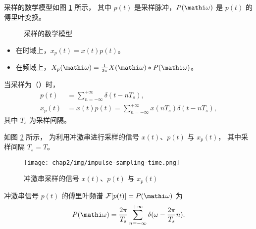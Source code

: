 \begin{definition}
    采样的数学模型如图 \ref{fig:sampling-math-model} 所示，
    其中 $p(t)$ 是采样脉冲，$P(\mathi \omega)$ 是 $p(t)$ 的傅里叶变换。
    \begin{figure}[H]
        \centering
        \caption{采样的数学模型}
        \label{fig:sampling-math-model}
    \end{figure}

    \begin{itemize}
        \item 在时域上，$x_p(t) = x(t)p(t)$。
        \item 在频域上，$X_p(\mathi \omega) = \frac{1}{2\pi}X(\mathi \omega) * P(\mathi \omega)$。
    \end{itemize}
    当采样为（）时，
    \begin{align*}
        p(t) & = \sum_{n = -\infty}^{+\infty}\delta(t - nT_s), \\
        x_p(t) & = x(t)p(t) = \sum_{n = -\infty}^{+\infty}x(nT_s)\delta(t - nT_s),
    \end{align*}
    其中 $T_s$ 为采样间隔。
\end{definition}

\begin{example}
    如图 \ref{fig:impulse-sampling-time} 所示，
    为利用冲激串进行采样的信号 $x(t)$、$p(t)$ 与 $x_p(t)$，
    其中采样间隔 $T_s = T$。
    \begin{figure}[H]
        \centering
        \texttt{[image: chap2/img/impulse-sampling-time.png]}
        \caption{冲激串采样的信号 $x(t)$、$p(t)$ 与 $x_p(t)$}
        \label{fig:impulse-sampling-time}
    \end{figure}
\end{example}

\begin{property}
    冲激串信号 $p(t)$ 的傅里叶频谱 $\mathcal{F}[p(t)] = P(\mathi \omega)$ 为
    \begin{align*}
        P(\mathi \omega) = \frac{2\pi}{T_s}\sum_{n = -\infty}^{+\infty}\delta(\omega - \frac{2\pi}{T_s}n).
    \end{align*}
    \label{property:impulse-sampling-frequency-1}
\end{property}

